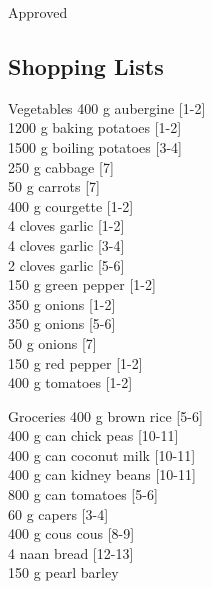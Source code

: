 \begin{menu}{Approved}
    \subsection*{Shopping Lists}
      \begin{shoppinglist}{Vegetables}
      400 g aubergine 
        {\scriptsize[1-2]}\\
      1200 g baking potatoes 
        {\scriptsize[1-2]}\\
      1500 g boiling potatoes 
        {\scriptsize[3-4]}\\
      250 g cabbage 
        {\scriptsize[7]}\\
      50 g carrots 
        {\scriptsize[7]}\\
      400 g courgette 
        {\scriptsize[1-2]}\\
      4 cloves garlic 
        {\scriptsize[1-2]}\\
      4 cloves garlic 
        {\scriptsize[3-4]}\\
      2 cloves garlic 
        {\scriptsize[5-6]}\\
      150 g green pepper 
        {\scriptsize[1-2]}\\
      350 g onions 
        {\scriptsize[1-2]}\\
      350 g onions 
        {\scriptsize[5-6]}\\
      50 g onions 
        {\scriptsize[7]}\\
      150 g red pepper 
        {\scriptsize[1-2]}\\
      400 g tomatoes 
        {\scriptsize[1-2]}\\
      \end{shoppinglist}%
      \begin{shoppinglist}{Groceries}
      400 g brown rice 
        {\scriptsize[5-6]}\\
      400 g can chick peas 
        {\scriptsize[10-11]}\\
      400 g can coconut milk 
        {\scriptsize[10-11]}\\
      400 g can kidney beans 
        {\scriptsize[10-11]}\\
      800 g can tomatoes 
        {\scriptsize[5-6]}\\
      60 g capers 
        {\scriptsize[3-4]}\\
      400 g cous cous 
        {\scriptsize[8-9]}\\
      4  naan bread 
        {\scriptsize[12-13]}\\
      150 g pearl barley 

\end{shoppinglist}
\end{menu}
